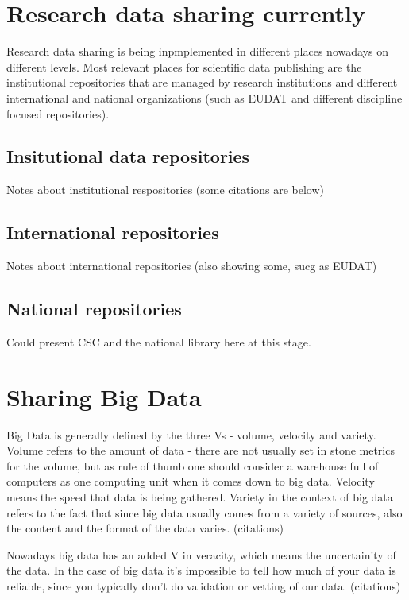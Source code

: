 \section{Research data sharing currently}

Research data sharing is being inpmplemented in different places nowadays on
different levels. Most relevant places for scientific data publishing are the
institutional repositories that are managed by research institutions and
different international and national organizations (such as EUDAT and
different discipline focused repositories).

\subsection{Insitutional data repositories}

Notes about institutional respositories (some citations are below)

\subsection{International repositories}

Notes about international repositories (also showing some, sucg as EUDAT)

\subsection{National repositories}

Could present CSC and the national library here at this stage.

\section{Sharing Big Data}

Big Data is generally defined by the three Vs - volume, velocity and variety.
Volume refers to the amount of data - there are not usually set in stone
metrics for the volume, but as rule of thumb one should consider a warehouse
full of computers as one computing unit when it comes down to big data.
Velocity means the speed that data is being gathered. Variety in the context
of big data refers to the fact that since big data usually comes from a variety
of sources, also the content and the format of the data varies. (citations)

Nowadays big data has an added V in veracity, which means the uncertainity of
the data. In the case of big data it's impossible to tell how much of your data
is reliable, since you typically don't do validation or vetting of our data.
(citations)

